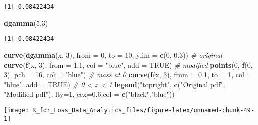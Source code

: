 \documentclass[]{book}
\newenvironment{Shaded}{\begin{snugshade}}{\end{snugshade}}
\newcommand{\KeywordTok}[1]{\textcolor[rgb]{0.13,0.29,0.53}{\textbf{#1}}}
\newcommand{\DataTypeTok}[1]{\textcolor[rgb]{0.13,0.29,0.53}{#1}}
\newcommand{\DecValTok}[1]{\textcolor[rgb]{0.00,0.00,0.81}{#1}}
\newcommand{\FloatTok}[1]{\textcolor[rgb]{0.00,0.00,0.81}{#1}}
\newcommand{\StringTok}[1]{\textcolor[rgb]{0.31,0.60,0.02}{#1}}
\newcommand{\CommentTok}[1]{\textcolor[rgb]{0.56,0.35,0.01}{\textit{#1}}}
\newcommand{\OtherTok}[1]{\textcolor[rgb]{0.56,0.35,0.01}{#1}}
\newcommand{\NormalTok}[1]{#1}
\theoremstyle{definition}
\theoremstyle{definition}
\theoremstyle{definition}
\theoremstyle{remark}
\begin{document}
\begin{verbatim}
[1] 0.08422434
\end{verbatim}

\begin{Shaded}
\begin{Highlighting}[]
\KeywordTok{dgamma}\NormalTok{(}\DecValTok{5}\NormalTok{,}\DecValTok{3}\NormalTok{)}
\end{Highlighting}
\end{Shaded}

\begin{verbatim}
[1] 0.08422434
\end{verbatim}

\begin{Shaded}
\begin{Highlighting}[]
\KeywordTok{curve}\NormalTok{(}\KeywordTok{dgamma}\NormalTok{(x, }\DecValTok{3}\NormalTok{), }\DataTypeTok{from =} \DecValTok{0}\NormalTok{, }\DataTypeTok{to =} \DecValTok{10}\NormalTok{, }\DataTypeTok{ylim =} \KeywordTok{c}\NormalTok{(}\DecValTok{0}\NormalTok{, }\FloatTok{0.3}\NormalTok{)) }\CommentTok{# original}
\KeywordTok{curve}\NormalTok{(}\KeywordTok{f}\NormalTok{(x, }\DecValTok{3}\NormalTok{), }\DataTypeTok{from =} \FloatTok{1.1}\NormalTok{, }\DataTypeTok{col =} \StringTok{"blue"}\NormalTok{, }\DataTypeTok{add =} \OtherTok{TRUE}\NormalTok{) }\CommentTok{# modified}
\KeywordTok{points}\NormalTok{(}\DecValTok{0}\NormalTok{, }\KeywordTok{f}\NormalTok{(}\DecValTok{0}\NormalTok{, }\DecValTok{3}\NormalTok{), }\DataTypeTok{pch =} \DecValTok{16}\NormalTok{, }\DataTypeTok{col =} \StringTok{"blue"}\NormalTok{) }\CommentTok{# mass at 0}
\KeywordTok{curve}\NormalTok{(}\KeywordTok{f}\NormalTok{(x, }\DecValTok{3}\NormalTok{), }\DataTypeTok{from =} \FloatTok{0.1}\NormalTok{, }\DataTypeTok{to =} \DecValTok{1}\NormalTok{, }\DataTypeTok{col =} \StringTok{"blue"}\NormalTok{, }\DataTypeTok{add =} \OtherTok{TRUE}\NormalTok{) }\CommentTok{# 0 < x < 1}
\KeywordTok{legend}\NormalTok{(}\StringTok{"topright"}\NormalTok{, }\KeywordTok{c}\NormalTok{(}\StringTok{"Original pdf"}\NormalTok{, }\StringTok{"Modified pdf"}\NormalTok{), }\DataTypeTok{lty=}\DecValTok{1}\NormalTok{, }\DataTypeTok{cex=}\FloatTok{0.6}\NormalTok{,}\DataTypeTok{col =} \KeywordTok{c}\NormalTok{(}\StringTok{"black"}\NormalTok{,}\StringTok{"blue"}\NormalTok{))}
\end{Highlighting}
\end{Shaded}

\begin{center}\texttt{[image: R\_for\_Loss\_Data\_Analytics\_files/figure-latex/unnamed-chunk-49-1]} \end{center}
\end{document}

